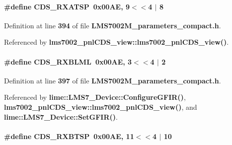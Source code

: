 \paragraph[{C\+D\+S\+\_\+\+R\+X\+A\+T\+SP}]{\setlength{\rightskip}{0pt plus 5cm}\#define C\+D\+S\+\_\+\+R\+X\+A\+T\+SP~0x00\+A\+E, 9$<$$<$4 $\vert$  8}\label{LMS7002M__parameters__compact_8h_a188c8aee673604ec73201e42a40a244b}


Definition at line {\bf 394} of file {\bf L\+M\+S7002\+M\+\_\+parameters\+\_\+compact.\+h}.



Referenced by {\bf lms7002\+\_\+pnl\+C\+D\+S\+\_\+view\+::lms7002\+\_\+pnl\+C\+D\+S\+\_\+view()}.

\paragraph[{C\+D\+S\+\_\+\+R\+X\+B\+L\+ML}]{\setlength{\rightskip}{0pt plus 5cm}\#define C\+D\+S\+\_\+\+R\+X\+B\+L\+ML~0x00\+A\+E, 3$<$$<$4 $\vert$  2}\label{LMS7002M__parameters__compact_8h_ae1c8986fc295a35d54deff3c878231e5}


Definition at line {\bf 397} of file {\bf L\+M\+S7002\+M\+\_\+parameters\+\_\+compact.\+h}.



Referenced by {\bf lime\+::\+L\+M\+S7\+\_\+\+Device\+::\+Configure\+G\+F\+I\+R()}, {\bf lms7002\+\_\+pnl\+C\+D\+S\+\_\+view\+::lms7002\+\_\+pnl\+C\+D\+S\+\_\+view()}, and {\bf lime\+::\+L\+M\+S7\+\_\+\+Device\+::\+Set\+G\+F\+I\+R()}.

\paragraph[{C\+D\+S\+\_\+\+R\+X\+B\+T\+SP}]{\setlength{\rightskip}{0pt plus 5cm}\#define C\+D\+S\+\_\+\+R\+X\+B\+T\+SP~0x00\+A\+E, 11$<$$<$4 $\vert$  10}\label{LMS7002M__parameters__compact_8h_a21e17bfe612dd60e97a70e18b824ad7d}


